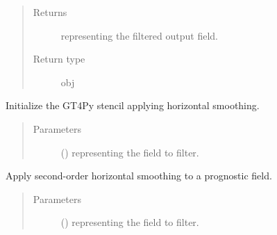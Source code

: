 \documentclass[letterpaper,10pt,english]{sphinxmanual}
\begin{document}
\begin{fulllineitems}
\begin{fulllineitems}
\begin{quote}
\begin{description}
\begin{itemize}
\end{itemize}

\item[{Returns}] \leavevmode
{} representing the filtered output field.

\item[{Return type}] \leavevmode
obj

\end{description}\end{quote}

\end{fulllineitems}


\begin{fulllineitems}
\label{\detokenize{api:dycore.horizontal_smoothing.HorizontalSmoothingSecondOrderXZ._stencil_initialize}}
Initialize the GT4Py stencil applying horizontal smoothing.
\begin{quote}\begin{description}
\item[{Parameters}] \leavevmode
{} () \textendash{}  representing the field to filter.

\end{description}\end{quote}

\end{fulllineitems}


\begin{fulllineitems}
\label{\detokenize{api:dycore.horizontal_smoothing.HorizontalSmoothingSecondOrderXZ.apply}}
Apply second-order horizontal smoothing to a prognostic field.
\begin{quote}\begin{description}
\item[{Parameters}] \leavevmode
{} () \textendash{}  representing the field to filter.


\end{description}
\end{quote}
\end{fulllineitems}
\end{fulllineitems}
\end{document}
